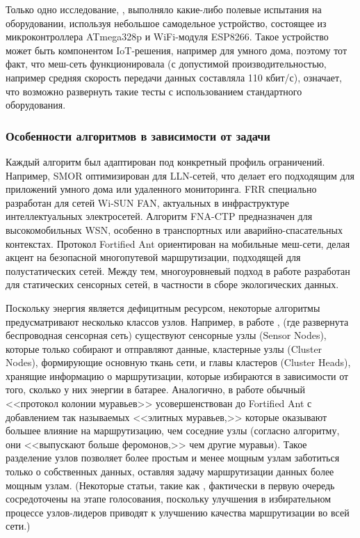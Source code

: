 \documentclass[%
]{report}
\begin{document}
Только одно исследование,
\textcite{MUHENDRA2017332},
выполняло какие-либо полевые испытания на оборудовании,
используя небольшое самодельное устройство,
состоящее из микроконтроллера ATmega328p
и WiFi-модуля ESP8266.
Такое устройство может быть компонентом
IoT-решения, например для умного дома,
поэтому тот факт, что меш-сеть функционировала
(с допустимой производительностью, например
средняя скорость передачи данных составляла 110 кбит/с),
означает, что возможно развернуть такие
тесты с использованием стандартного оборудования.

\subsubsection{Особенности алгоритмов в зависимости от задачи}\label{specific-considerations-for-algorithm-usage-scope}

Каждый алгоритм был адаптирован под конкретный
профиль ограничений.
Например, SMOR оптимизирован для LLN-сетей, что
делает его подходящим для приложений
умного дома или удаленного мониторинга.
FRR специально разработан для сетей Wi-SUN FAN,
актуальных в инфраструктуре интеллектуальных электросетей.
Алгоритм FNA-CTP предназначен для высокомобильных WSN,
особенно в транспортных или аварийно-спасательных контекстах.
Протокол Fortified Ant ориентирован на мобильные меш-сети,
делая акцент на безопасной многопутевой маршрутизации,
подходящей для полустатических сетей.
Между тем, многоуровневый подход в работе
\textcite{ALVAREZ2008240}
разработан для статических сенсорных сетей,
в частности в сборе экологических данных.

Поскольку энергия является дефицитным ресурсом,
некоторые алгоритмы предусматривают несколько классов узлов.
Например, в работе \textcite{ZHENG2020443},
(где развернута беспроводная сенсорная сеть)
существуют сенсорные узлы (Sensor Nodes),
которые только собирают и отправляют данные,
кластерные узлы (Cluster Nodes),
формирующие основную ткань сети,
и главы кластеров (Cluster Heads),
хранящие информацию о маршрутизации,
которые избираются в зависимости от того,
сколько у них энергии в батарее.
Аналогично, в работе \textcite{LI2020570}
обычный <<протокол колонии муравьев>>
усовершенствован до Fortified Ant
с добавлением так называемых <<элитных муравьев,>>
которые оказывают большее влияние на маршрутизацию,
чем соседние узлы (согласно алгоритму, они <<выпускают больше феромонов,>> чем другие муравьи).
Такое разделение узлов позволяет более простым
и менее мощным узлам заботиться только о
собственных данных,
оставляя задачу маршрутизации данных
более мощным узлам.
(Некоторые статьи,
такие как \textcite{ALI2024102356},
фактически в первую очередь сосредоточены на этапе голосования,
поскольку улучшения в избирательном процессе узлов-лидеров
приводят к улучшению качества маршрутизации во всей сети.)
\end{document}
